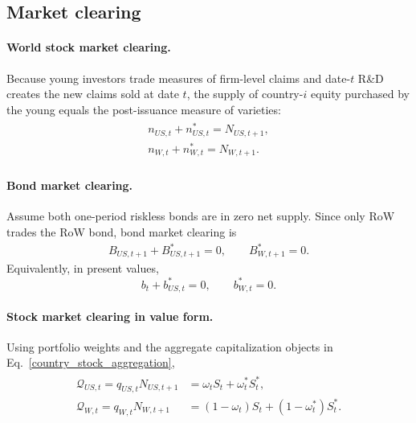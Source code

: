 \documentclass{article}
\begin{document}
\subsection{Market clearing}

\paragraph{World stock market clearing.}
Because young investors trade measures of firm-level claims and date-$t$ R\&D creates the new claims sold at date $t$, the supply of country-$i$ equity purchased by the young equals the post-issuance measure of varieties:
\begin{align}\label{stock_clear_mod}
\begin{split}
n_{US,t}+n^*_{US,t}=N_{US,t+1},\\
n_{W,t}+n^*_{W,t}=N_{W,t+1}.
\end{split}
\end{align}

\paragraph{Bond market clearing.}
Assume both one-period riskless bonds are in zero net supply. Since only RoW trades the RoW bond, bond market clearing is
\begin{align}\label{bond_clear_mod_zerosupply}
B_{US,t+1}+B^*_{US,t+1}=0,
\qquad
B^*_{W,t+1}=0.
\end{align}
Equivalently, in present values,
\[
b_t+b_{US,t}^*=0,
\qquad
b_{W,t}^*=0.
\]

\paragraph{Stock market clearing in value form.}
Using portfolio weights and the aggregate capitalization objects in Eq.~\eqref{country_stock_aggregation},
\begin{align}\label{stock_weight_clear_mod}
\begin{split}
\mathcal Q_{US,t}=q_{US,t}N_{US,t+1} &= \omega_t S_t+\omega_t^*S_t^*,\\
\mathcal Q_{W,t}=q_{W,t}N_{W,t+1}  &= (1-\omega_t)S_t+(1-\omega_t^*)S_t^*.
\end{split}
\end{align}
\end{document}
